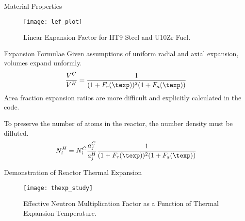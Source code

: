 \begin{frame}{Material Properties}
  \begin{figure}
    \centering
    \texttt{[image: lef\_plot]}
    \caption{Linear Expansion Factor for HT9 Steel and U10Zr Fuel.}
    \label{fig:lef_plot}
  \end{figure}
\end{frame}

\begin{frame}{Expansion Formulae}
  Given assumptions of uniform radial and axial expansion, volumes expand
  unformly.
  \begin{equation}
    \label{eq:volume_ratio}
    \frac{V^C}{V^H} = \frac{1}{(1+F_r(\texp))^2 (1+F_a(\texp))}
  \end{equation}
  Area fraction expansion ratios are more difficult and explicitly calculated in
  the code.

  To preserve the number of atoms in the reactor, the number density must be
  dilluted.
  \begin{equation}
    \label{eq:nden_thexp_update}
    N_i^H = N_i^C \frac{a_j^C}{a_j^H} 
      \frac{1}{(1+F_r(\texp))^2 (1+F_a(\texp))}
  \end{equation}
\end{frame}

\begin{frame}{Demonstration of Reactor Thermal Expansion}
  \begin{figure}
    \centering
    \texttt{[image: thexp\_study]}
    \caption{Effective Neutron Multiplication Factor as a Function of 
      Thermal Expansion Temperature.}
    \label{fig:thexp_study}
  \end{figure}
\end{frame}
